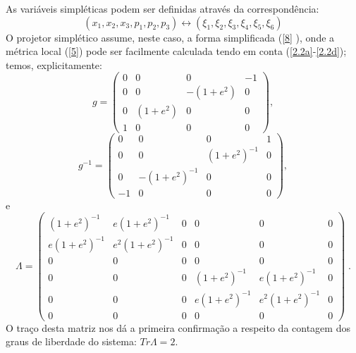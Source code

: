 \documentclass[a4paper,thmsa,12pt]{report}
\begin{document}
As vari\'{a}veis simpl\'{e}ticas podem ser definidas atrav\'{e}s da
correspond\^{e}ncia: 
\begin{equation}
(x_{1},x_{2},x_{3},p_{1},p_{2},p_{3})\leftrightarrow (\xi _{1},\xi _{2},\xi
_{3},\xi _{4},\xi _{5},\xi _{6})  \label{2.3}
\end{equation}
O projetor simpl\'{e}tico assume, neste caso, a forma simplificada (\ref{8}%
), onde a m\'{e}trica local (\ref{5}) pode ser facilmente calculada tendo em
conta (\ref{2.2a}-\ref{2.2d}); temos, explicitamente: 
\begin{equation}
g=\left( 
\begin{array}{cccc}
0 & 0 & 0 & -1 \\ 
0 & 0 & -(1+e^{2}) & 0 \\ 
0 & (1+e^{2}) & 0 & 0 \\ 
1 & 0 & 0 & 0
\end{array}
\right) ,  \label{2.4}
\end{equation}
\begin{equation}
g^{-1}=\left( 
\begin{array}{cccc}
0 & 0 & 0 & 1 \\ 
0 & 0 & \left( 1+e^{2}\right) ^{-1} & 0 \\ 
0 & -\left( 1+e^{2}\right) ^{-1} & 0 & 0 \\ 
-1 & 0 & 0 & 0
\end{array}
\right) ,  \label{2.5}
\end{equation}
e 
\begin{equation}
\Lambda =\left( 
\begin{array}{cccccc}
\left( 1+e^{2}\right) ^{-1} & e\left( 1+e^{2}\right) ^{-1} & 0 & 0 & 0 & 0
\\ 
e\left( 1+e^{2}\right) ^{-1} & e^{2}\left( 1+e^{2}\right) ^{-1} & 0 & 0 & 0
& 0 \\ 
0 & 0 & 0 & 0 & 0 & 0 \\ 
0 & 0 & 0 & \left( 1+e^{2}\right) ^{-1} & e\left( 1+e^{2}\right) ^{-1} & 0
\\ 
0 & 0 & 0 & e\left( 1+e^{2}\right) ^{-1} & e^{2}\left( 1+e^{2}\right) ^{-1}
& 0 \\ 
0 & 0 & 0 & 0 & 0 & 0
\end{array}
\right) \;. \label{2.6}
\end{equation}
O tra\c{c}o desta matriz nos d\'{a} a primeira confirma\c{c}\~{a}o a
respeito da contagem dos graus de liberdade do sistema: $Tr\Lambda =2.$
\end{document}
